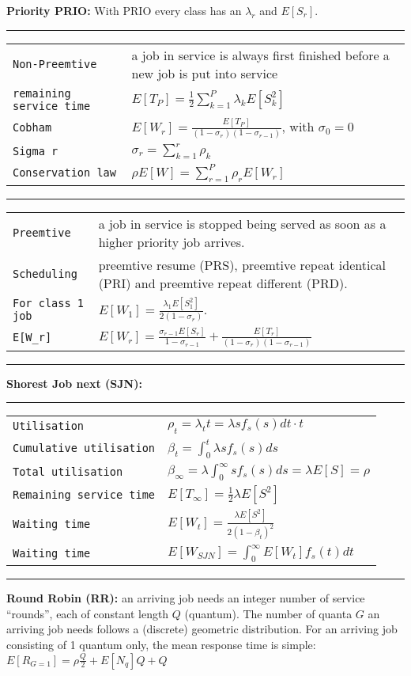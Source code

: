 \textbf{Priority PRIO:} With PRIO every class has an $\lambda_{r}$ and $E[S_{r}]$. 
\hrule
{}
\begin{tabular}{@{}p{\the\MyLen}@{}p{\linewidth-\the\MyLen}@{}}
\verb!Non-Preemtive! &  a job in service is always first finished before a new job is put into service\\
\verb!remaining service time! & $E[T_P] = \frac{1}{2}\sum_{k=1}^{P} \lambda_k E[S^{2}_{k}]$\\
\verb!Cobham! & $E[W_r] = \frac{E[T_P]}{(1-\sigma_r)(1-\sigma_{r-1})}$, with $\sigma_0 = 0$\\
\verb!Sigma r! & $\sigma_r = \sum_{k=1}^{r} \rho_k$\\
\verb!Conservation law! & $\rho E[W] = \sum_{r=1}^{P} \rho_r E[W_r]$\\
\end{tabular}
\hrule
{}
\begin{tabular}{@{}p{\the\MyLen}@{}p{\linewidth-\the\MyLen}@{}}
\verb!Preemtive! & a job in service is stopped being served as soon as a higher priority job arrives.\\
\verb!Scheduling! & preemtive resume (PRS), preemtive repeat identical (PRI) and preemtive repeat different (PRD).\\
\verb!For class 1 job! & $E[W_1] = \frac{\lambda_1 E[S^{2}_1]}{2(1-\sigma_r)}$.\\
\verb!E[W_r]! & $E[W_r] = \frac{\sigma_{r-1} E[S_r]}{1-\sigma_{r-1}} + \frac{E[T_r]}{(1-\sigma_{r})(1-\sigma_{r-1})}$\\
\end{tabular}
\hrule

\textbf{Shorest Job next (SJN):}
\hrule
{}
\begin{tabular}{@{}p{\the\MyLen}@{}p{\linewidth-\the\MyLen}@{}}
\verb!Utilisation! & $\rho_t = \lambda_t t = \lambda s f_s(s)dt \cdot t$\\
\verb!Cumulative utilisation! & $\beta_t = \int_0^t \lambda s f_s(s) ds$\\
\verb!Total utilisation! & $\beta_\infty = \lambda \int_0^\infty s f_s(s) ds = \lambda E[S] = \rho$ \\
\verb!Remaining service time! & $E[T_\infty] = \frac{1}{2} \lambda E[S^2]$ \\
\verb!Waiting time! & $E[W_t] = \frac{\lambda E[S^2]}{2(1-\beta_t)^2}$ \\
\verb!Waiting time! & $E[W_{SJN}] = \int^\infty_0 E[W_t] f_s(t) dt$ \\
\end{tabular}
\hrule
\textbf{Round Robin (RR):} an arriving job needs an integer number of service “rounds”, each of constant length $Q$ (quantum).  The number of quanta $G$ an arriving job needs follows a (discrete) geometric distribution. For an arriving job consisting of 1 quantum only, the mean response time is simple: $E[R_{G=1}] = \rho \frac{Q}{2} + E[N_q]Q + Q$

